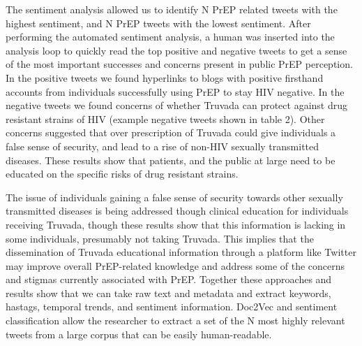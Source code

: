 The sentiment analysis allowed us to identify N PrEP related tweets with the highest sentiment, and N PrEP tweets with the lowest sentiment. After performing the automated sentiment analysis, a human was inserted into the analysis loop to quickly read the top positive and negative tweets to get a sense of the most important successes and concerns present in public PrEP perception. In the positive tweets we found hyperlinks to blogs with positive firsthand accounts from individuals successfully using PrEP to stay HIV negative. In the negative tweets we found concerns of whether Truvada can protect against drug resistant strains of HIV (example negative tweets shown in table 2). Other concerns suggested that over prescription of Truvada could give individuals a false sense of security, and lead to a rise of non-HIV sexually transmitted diseases. These results show that patients, and the public at large need to be educated on the specific risks of drug resistant strains.

The issue of individuals gaining a false sense of security towards other sexually transmitted diseases is being addressed though clinical education for individuals receiving Truvada, though these results show that this information is lacking in some individuals, presumably not taking Truvada. This implies that the dissemination of Truvada educational information through a platform like Twitter may improve overall PrEP-related knowledge and address some of the concerns and stigmas currently associated with PrEP. Together these approaches and results show that we can take raw text and metadata and extract keywords, hastags, temporal trends, and sentiment information. Doc2Vec and sentiment classification allow the researcher to extract a set of the N most highly relevant tweets from a large corpus that can be easily human-readable.

